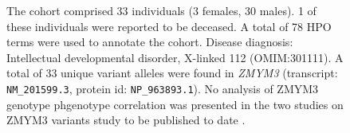 \begin{figure}[htbp]
    \vspace{2em}
    
    \caption{ The cohort comprised 33 individuals (3 females, 30 males). 1 of these individuals were reported to be deceased. A total of 78 HPO terms were used to annotate the cohort. Disease diagnosis: Intellectual developmental disorder, X-linked 112 (OMIM:301111).  A total of 33 unique variant alleles were found in \textit{ZMYM3} (transcript: \texttt{NM\_201599.3}, protein id: \texttt{NP\_963893.1}). No analysis of ZMYM3 genotype phgenotype correlation was presented in the two studies on ZMYM3 variants study to be published to date \cite{PMID_24721225,PMID_36586412}.}
    \end{figure}
    
